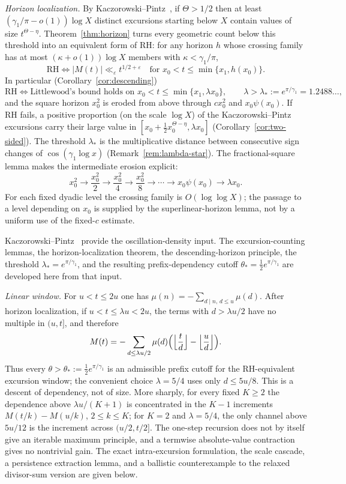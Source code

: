 \documentclass[11pt]{amsart}
\numberwithin{equation}{section}
\theoremstyle{plain}
\theoremstyle{definition}
\theoremstyle{remark}
\newcommand{\eps}{\varepsilon}
\begin{document}
\smallskip\noindent\emph{Horizon localization.} By
Kaczorowski--Pintz~\cite{KP86}, if $\Theta>1/2$ then at least
$(\gamma_1/\pi-o(1))\log X$ distinct excursions starting below $X$ contain
values of size $t^{\Theta-\eta}$. Theorem~\ref{thm:horizon} turns every
geometric count below this threshold into an equivalent form of RH: for any
horizon $h$ whose crossing family has at most $(\kappa+o(1))\log X$ members
with $\kappa<\gamma_1/\pi$,
\[
\mathrm{RH}\iff |M(t)|\ll_\eps t^{1/2+\eps}\quad\text{for }x_0<t\le\min\{x_1,h(x_0)\}.
\]
In particular (Corollary~\ref{cor:descending})
\[
\mathrm{RH}\iff\text{Littlewood's bound holds on }x_0<t\le\min\{x_1,\lambda x_0\},
\qquad\lambda>\lambda_*:=e^{\pi/\gamma_1}=1.2488\ldots,
\]
and the square horizon $x_0^2$ is eroded from above through $cx_0^2$ and
$x_0\psi(x_0)$. If RH fails, a positive proportion (on the scale $\log X$) of the
Kaczorowski--Pintz excursions carry their large value in
$[x_0+\frac12x_0^{\Theta-\eta},\lambda x_0]$ (Corollary~\ref{cor:two-sided}). The threshold $\lambda_*$ is the multiplicative distance
between consecutive sign changes of $\cos(\gamma_1\log x)$
(Remark~\ref{rem:lambda-star}).  The fractional-square lemma makes the
intermediate erosion explicit:
\[
x_0^2\longrightarrow \frac{x_0^2}{2}\longrightarrow
\frac{x_0^2}{4}\longrightarrow\frac{x_0^2}{8}\longrightarrow\cdots
\longrightarrow x_0\psi(x_0)\longrightarrow\lambda x_0.
\]
For each fixed dyadic level the crossing family is $O(\log\log X)$; the
passage to a level depending on $x_0$ is supplied by the superlinear-horizon
lemma, not by a uniform use of the fixed-$c$ estimate.

Kaczorowski--Pintz~\cite{KP86} provide the oscillation-density input.  The
excursion-counting lemmas, the horizon-localization theorem, the
descending-horizon principle, the threshold
$\lambda_*=e^{\pi/\gamma_1}$, and the resulting prefix-dependency cutoff
$\theta_*=\tfrac12e^{\pi/\gamma_1}$ are developed here from that input.

\smallskip\noindent\emph{Linear window.} For $u<t\le2u$ one has
$\mu(n)=-\sum_{d\mid n,\,d\le u}\mu(d)$.  After horizon localization,
if $u<t\le\lambda u<2u$, the terms with $d>\lambda u/2$ have no multiple
in $(u,t]$, and therefore
\[
M(t)=-\sum_{d\le\lambda u/2}\mu(d)
\Bigl(\Bigl\lfloor\frac td\Bigr\rfloor-\Bigl\lfloor\frac ud\Bigr\rfloor\Bigr).
\]
Thus every $\theta>\theta_*:=\frac12e^{\pi/\gamma_1}$ is an admissible
prefix cutoff for the RH-equivalent excursion window; the convenient choice
$\lambda=5/4$ uses only $d\le5u/8$.  This is a descent of dependency, not
of size.  More sharply, for every fixed $K\ge2$ the dependence above
$\lambda u/(K+1)$ is concentrated in the $K-1$ increments
$M(t/k)-M(u/k)$, $2\le k\le K$; for $K=2$ and $\lambda=5/4$, the only channel
above $5u/12$ is the increment across $(u/2,t/2]$.  The one-step recursion
does not by itself give an iterable maximum principle, and a termwise
absolute-value contraction gives no nontrivial gain.  The exact
intra-excursion formulation, the scale cascade, a persistence extraction
lemma, and a ballistic counterexample to the relaxed divisor-sum version are
given below.
\end{document}
